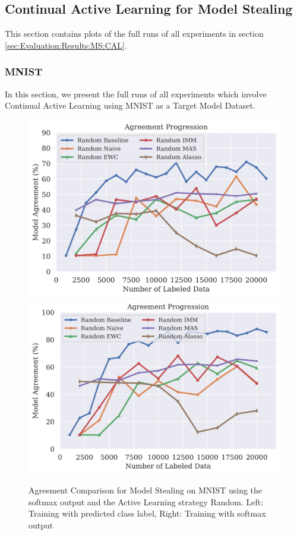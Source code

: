 \subsection{Continual Active Learning for Model Stealing}
\label{sec:Appendix:CALMS}
This section contains plots of the full runs of all experiments in section \ref{sec:Evaluation:Results:MS:CAL}.

\subsubsection{MNIST}
\label{sec:Appendix:CALMS:MNIST}
In this section, we present the full runs of all experiments which involve Continual Active Learning using MNIST as a Target Model Dataset.

\begin{figure}[!htb]
    \centering
    \includegraphics[width=0.48\linewidth]{images/results_CALMS/mnist_label_random.png} \hfill
    \includegraphics[width=0.48\linewidth]{images/results_CALMS/mnist_softmax_random.png}
    \caption{Agreement Comparison for Model Stealing on MNIST using the softmax output and the Active Learning strategy Random. Left: Training with predicted class label,
    Right: Training with softmax output}
    \label{fig:CALMSMNISTRandom}
\end{figure}

